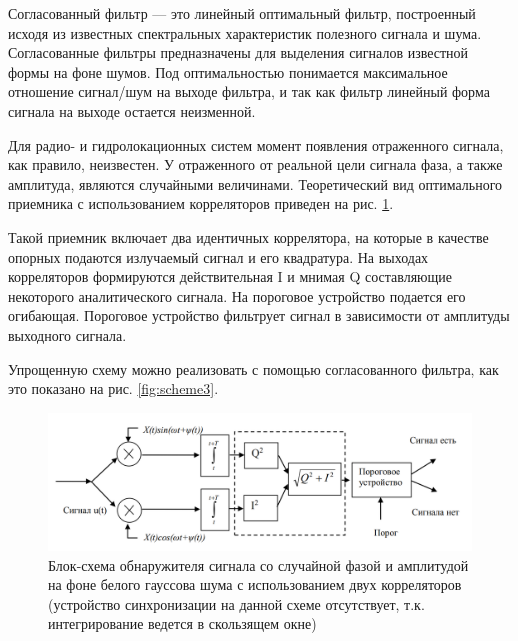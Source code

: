 

Согласованный фильтр — это линейный оптимальный фильтр, построенный исходя из известных
спектральных характеристик полезного сигнала и шума. Согласованные фильтры предназначены
для выделения сигналов известной формы на фоне шумов. Под оптимальностью понимается
максимальное отношение сигнал/шум на выходе фильтра, и так как фильтр линейный форма
сигнала на выходе остается неизменной.



Для радио- и гидролокационных систем момент появления отраженного
сигнала, как правило, неизвестен. У отраженного от реальной цели сигнала фаза, а
также амплитуда, являются случайными величинами. Теоретический вид оптимального
приемника с использованием корреляторов приведен на рис. \ref{fig:scheme2}.

Такой приемник включает два идентичных коррелятора, на которые в
качестве опорных подаются излучаемый сигнал и его квадратура. На выходах
корреляторов формируются действительная I и мнимая Q составляющие
некоторого аналитического сигнала. На пороговое устройство подается его
огибающая. 
Пороговое устройство фильтрует сигнал в зависимости от амплитуды выходного сигнала.

Упрощенную схему можно реализовать с
помощью согласованного фильтра, как это показано на рис. \ref{fig:scheme3}.

\begin{figure}[h!]
	\centering
	\includegraphics[width =0.8\linewidth]{imgs/scheme2.png}
	\caption{Блок-схема обнаружителя сигнала со случайной фазой и амплитудой на фоне белого
    гауссова шума с использованием двух корреляторов (устройство синхронизации на данной
    схеме отсутствует, т.к. интегрирование ведется в скользящем окне)
    }
	\label{fig:scheme2}
\end{figure}

